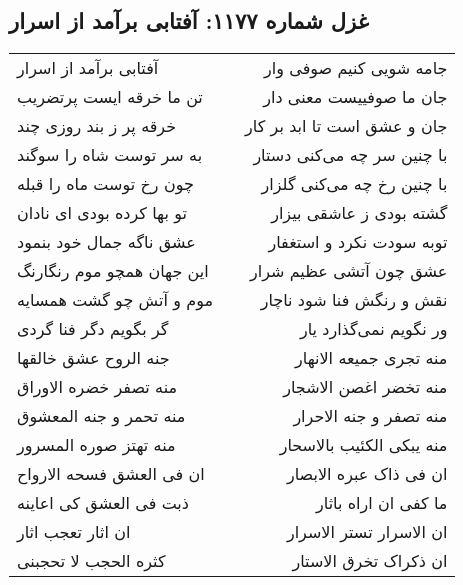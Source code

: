 \begin{center}
\section*{غزل شماره ۱۱۷۷: آفتابی برآمد از اسرار}
\label{sec:1177}
\begin{longtable}{l p{0.5cm} r}
آفتابی برآمد از اسرار
&&
جامه شویی کنیم صوفی وار
\\
تن ما خرقه ایست پرتضریب
&&
جان ما صوفییست معنی دار
\\
خرقه پر ز بند روزی چند
&&
جان و عشق است تا ابد بر کار
\\
به سر توست شاه را سوگند
&&
با چنین سر چه می‌کنی دستار
\\
چون رخ توست ماه را قبله
&&
با چنین رخ چه می‌کنی گلزار
\\
تو بها کرده بودی ای نادان
&&
گشته بودی ز عاشقی بیزار
\\
عشق ناگه جمال خود بنمود
&&
توبه سودت نکرد و استغفار
\\
این جهان همچو موم رنگارنگ
&&
عشق چون آتشی عظیم شرار
\\
موم و آتش چو گشت همسایه
&&
نقش و رنگش فنا شود ناچار
\\
گر بگویم دگر فنا گردی
&&
ور نگویم نمی‌گذارد یار
\\
جنه الروح عشق خالقها
&&
منه تجری جمیعه الانهار
\\
منه تصفر خضره الاوراق
&&
منه تخضر اغصن الاشجار
\\
منه تحمر و جنه المعشوق
&&
منه تصفر و جنه الاحرار
\\
منه تهتز صوره المسرور
&&
منه یبکی الکئیب بالاسحار
\\
ان فی العشق فسحه الارواح
&&
ان فی ذاک عبره الابصار
\\
ذبت فی العشق کی اعاینه
&&
ما کفی ان اراه باثار
\\
ان اثار تعجب اثار
&&
ان الاسرار تستر الاسرار
\\
کثره الحجب لا تحجبنی
&&
ان ذکراک تخرق الاستار
\\
\end{longtable}
\end{center}
